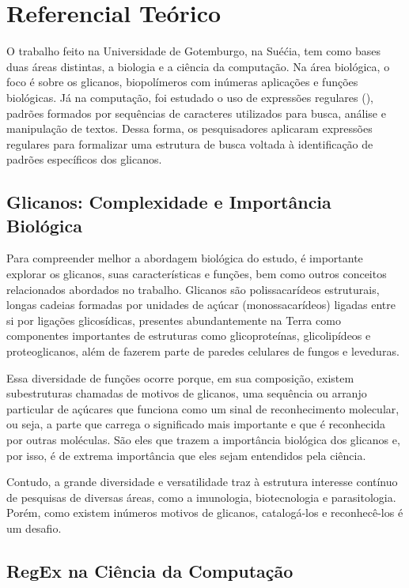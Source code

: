 \chapter{Referencial Teórico}

O trabalho feito na Universidade de Gotemburgo, na Suéćia, tem como bases duas áreas distintas, a biologia e a ciência da computação. Na área biológica, o foco é sobre os glicanos, biopolímeros com inúmeras aplicações e funções biológicas. Já na computação, foi estudado o uso de expressões regulares (), padrões formados por sequências de caracteres utilizados para busca, análise e manipulação de textos. Dessa forma, os pesquisadores aplicaram expressões regulares para formalizar uma estrutura de busca voltada à identificação de padrões específicos dos glicanos.

\section{Glicanos: Complexidade e Importância Biológica}

Para compreender melhor a abordagem biológica do estudo, é importante explorar os glicanos, suas características e funções, bem como outros conceitos relacionados abordados no trabalho. Glicanos são polissacarídeos estruturais, longas cadeias formadas por unidades de açúcar (monossacarídeos) ligadas entre si por ligações glicosídicas, presentes abundantemente na Terra como componentes importantes de estruturas como glicoproteínas, glicolipídeos e proteoglicanos, além de fazerem parte de paredes celulares de fungos e leveduras.

Essa diversidade de funções ocorre porque, em sua composição, existem subestruturas chamadas de motivos de glicanos, uma sequência ou arranjo particular de açúcares que funciona como um sinal de reconhecimento molecular, ou seja, a parte que carrega o significado mais importante e que é reconhecida por outras moléculas. São eles que trazem a importância biológica dos glicanos e, por isso, é de extrema importância que eles sejam entendidos pela ciência. 

Contudo, a grande diversidade e versatilidade traz à estrutura interesse contínuo de pesquisas de diversas áreas, como a imunologia, biotecnologia e parasitologia. Porém, como existem inúmeros motivos de glicanos, catalogá-los e reconhecê-los é um desafio.

\section{RegEx na Ciência da Computação}

